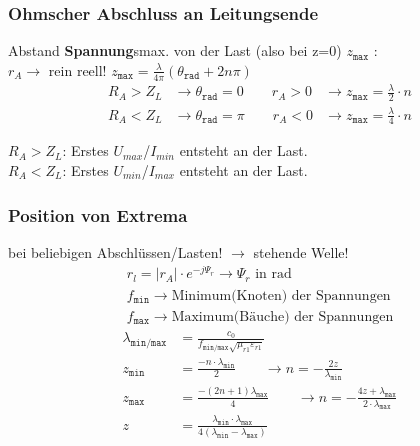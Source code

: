 %
%

\subsubsection{Ohmscher Abschluss an Leitungsende}
Abstand \textbf{Spannung}smax. von der Last (also bei z=0) $ z_{\texttt{max}} $ :\\
$ r_A \rightarrow$ rein reell! \qquad $ z_{\texttt{max}} = \frac{\lambda}{4\pi} (\theta_{\texttt{rad}}+2n\pi)$
\begin{align*}
	R_A > Z_L & \rightarrow\theta_{\texttt{rad}} = 0 \qquad r_A >0
	& \rightarrow z_\texttt{max}=\frac{\lambda}{2}\cdot n\\
	R_A < Z_L& \rightarrow\theta_{\texttt{rad}} = \pi \qquad r_A <0                          
	& \rightarrow z_\texttt{max}=\frac{\lambda}{4}\cdot n
	\end{align*}

$ R_A > Z_L $: Erstes $ U_{max}$/$ I_{min} $ entsteht an der Last.\\
$ R_A < Z_L $: Erstes $ U_{min}$/$ I_{max} $ entsteht an der Last.

\subsubsection{Position von Extrema}
bei beliebigen Abschlüssen/Lasten! $ \rightarrow $ stehende Welle!
\begin{gather*}
	\boxed{r_{l} = |r_A|\cdot e^{-j\Psi_r}}\rightarrow\Psi_r\text{ in rad}\\
	f_\texttt{min}\rightarrow \text{Minimum(Knoten) der Spannungen}\\
	f_\texttt{max}\rightarrow \text{Maximum(Bäuche) der Spannungen}
\end{gather*}
\begin{align*}
	\lambda_\texttt{min/max} & = \frac{c_0}{f_\texttt{min/max}\sqrt{\mu_{r1}\varepsilon_{r1}}}                                                                                                 \\
	z_\texttt{min}           & =\frac{-n\cdot\lambda_\texttt{min}}{2}                                        \qquad\rightarrow n = -\frac{2z}{\lambda_\texttt{min}}                            \\
	z_\texttt{max}           & =\frac{-(2n+1)\lambda_\texttt{max}}{4}                                        \qquad\rightarrow n = -\frac{4z+\lambda_\texttt{max}}{2\cdot\lambda_\texttt{max}} \\
	z                        & = \frac{\lambda_\texttt{min}\cdot\lambda_\texttt{max}}{4(\lambda_\texttt{min}-\lambda_\texttt{max})}
\end{align*}

